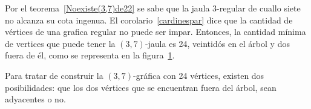 \documentclass[11pt]{book}
\theoremstyle{definition}
\begin{document}
Por el teorema~\ref{Noexiste(3,7)de22} se sabe que la jaula $3$-regular
de cuallo siete no alcanza su cota ingenua. El corolario~\ref{cardinespar} dice que la cantidad de vértices de
una grafica regular no
puede ser impar. Entonces, la cantidad mínima de vertices que puede
tener la $(3,7)$-jaula es 24, veintidós en el árbol y dos fuera de él,
como se representa en la figura~\ref{arbol(3,7)mas2}.


\begin{figure}
  \centering
  \caption{} \label{arbol(3,7)mas2}
\end{figure}

Para tratar de construir la $(3,7)$-gráfica con 24 vértices, existen
dos posibilidades: que los dos vértices que se encuentran fuera del árbol, sean
adyacentes o no.
\end{document}
